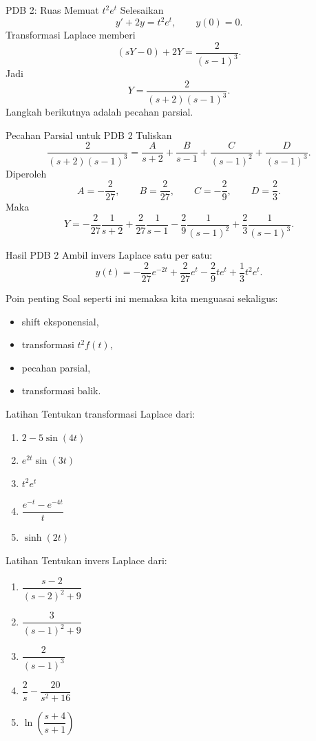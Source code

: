 \documentclass[aspectratio=169,10pt]{beamer}
\begin{document}
\begin{frame}{PDB 2: Ruas Memuat $t^2e^t$}
Selesaikan
\[
y'+2y=t^2e^t,
\qquad y(0)=0.
\]
Transformasi Laplace memberi
\[
(sY-0)+2Y=\frac{2}{(s-1)^3}.
\]
Jadi
\[
Y=\frac{2}{(s+2)(s-1)^3}.
\]
Langkah berikutnya adalah pecahan parsial.
\end{frame}

\begin{frame}{Pecahan Parsial untuk PDB 2}
Tuliskan
\[
\frac{2}{(s+2)(s-1)^3}
=
\frac{A}{s+2}+\frac{B}{s-1}+\frac{C}{(s-1)^2}+\frac{D}{(s-1)^3}.
\]
Diperoleh
\[
A=-\frac{2}{27},\qquad B=\frac{2}{27},\qquad C=-\frac{2}{9},\qquad D=\frac{2}{3}.
\]
Maka
\[
Y=-\frac{2}{27}\frac{1}{s+2}+\frac{2}{27}\frac{1}{s-1}-\frac{2}{9}\frac{1}{(s-1)^2}+\frac{2}{3}\frac{1}{(s-1)^3}.
\]
\end{frame}

\begin{frame}{Hasil PDB 2}
Ambil invers Laplace satu per satu:
\[
y(t)=-\frac{2}{27}e^{-2t}+\frac{2}{27}e^t-\frac{2}{9}te^t+\frac13 t^2 e^t.
\]
\begin{block}{Poin penting}
Soal seperti ini memaksa kita menguasai sekaligus:
\begin{itemize}
\item shift eksponensial,
\item transformasi $t^2f(t)$,
\item pecahan parsial,
\item transformasi balik.
\end{itemize}
\end{block}
\end{frame}

\begin{frame}{Latihan}
Tentukan transformasi Laplace dari:
\begin{enumerate}
\item $2-5\sin(4t)$
\item $e^{2t}\sin(3t)$
\item $t^2e^t$
\item $\dfrac{e^{-t}-e^{-4t}}{t}$
\item $\sinh(2t)$
\end{enumerate}
\end{frame}

\begin{frame}{Latihan}
Tentukan invers Laplace dari:
\begin{enumerate}
\item $\dfrac{s-2}{(s-2)^2+9}$
\item $\dfrac{3}{(s-1)^2+9}$
\item $\dfrac{2}{(s-1)^3}$
\item $\dfrac{2}{s}-\dfrac{20}{s^2+16}$
\item $\ln\left(\dfrac{s+4}{s+1}\right)$
\end{enumerate}
\end{frame}
\end{document}
